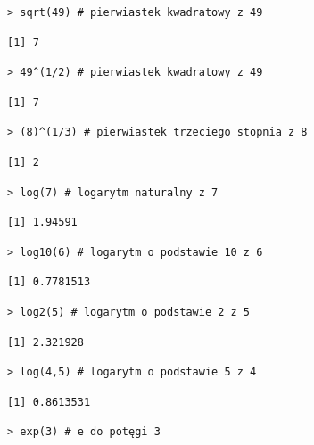 \documentclass[12pt,B5paper,]{book}
\begin{document}
\begin{verbatim}
> sqrt(49) # pierwiastek kwadratowy z 49
\end{verbatim}

\begin{verbatim}
[1] 7
\end{verbatim}

\begin{verbatim}
> 49^(1/2) # pierwiastek kwadratowy z 49
\end{verbatim}

\begin{verbatim}
[1] 7
\end{verbatim}

\begin{verbatim}
> (8)^(1/3) # pierwiastek trzeciego stopnia z 8
\end{verbatim}

\begin{verbatim}
[1] 2
\end{verbatim}

\begin{verbatim}
> log(7) # logarytm naturalny z 7
\end{verbatim}

\begin{verbatim}
[1] 1.94591
\end{verbatim}

\begin{verbatim}
> log10(6) # logarytm o podstawie 10 z 6
\end{verbatim}

\begin{verbatim}
[1] 0.7781513
\end{verbatim}

\begin{verbatim}
> log2(5) # logarytm o podstawie 2 z 5
\end{verbatim}

\begin{verbatim}
[1] 2.321928
\end{verbatim}

\begin{verbatim}
> log(4,5) # logarytm o podstawie 5 z 4
\end{verbatim}

\begin{verbatim}
[1] 0.8613531
\end{verbatim}

\begin{verbatim}
> exp(3) # e do potęgi 3
\end{verbatim}
\end{document}
